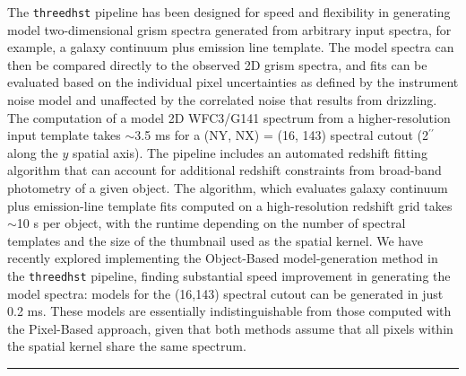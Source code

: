 \documentclass[preprint]{aastex}
\begin{document}
The \texttt{threedhst} pipeline has been designed for speed and flexibility in generating model two-dimensional grism spectra generated from arbitrary input spectra, for example, a galaxy continuum plus emission line template.  The model spectra can then be compared directly to the observed 2D grism spectra, and fits can be evaluated based on the individual pixel uncertainties as defined by the instrument noise model and unaffected by the correlated noise that results from drizzling.  The computation of a model 2D WFC3/G141 spectrum from a higher-resolution input template takes $\sim$3.5 ms for a (NY, NX) = (16, 143) spectral cutout (2$^{\prime\prime}$ along the $y$ spatial axis).  The pipeline includes an automated redshift fitting algorithm that can account for additional redshift constraints from broad-band photometry of a given object.  The algorithm, which evaluates galaxy continuum plus emission-line template fits computed on a high-resolution redshift grid takes $\sim$10 s per object, with the runtime depending on the number of spectral templates and the size of the thumbnail used as the spatial kernel.  We have recently explored implementing the Object-Based model-generation method in the \texttt{threedhst} pipeline, finding substantial speed improvement in generating the model spectra:  models for the (16,143) spectral cutout can be generated in just 0.2 ms.  These models are essentially indistinguishable from those computed with the Pixel-Based approach, given that both methods assume that all pixels within the spatial kernel share the same spectrum.  

\noindent\hfil\rule{0.5\textwidth}{.4pt}\hfil
\end{document}
